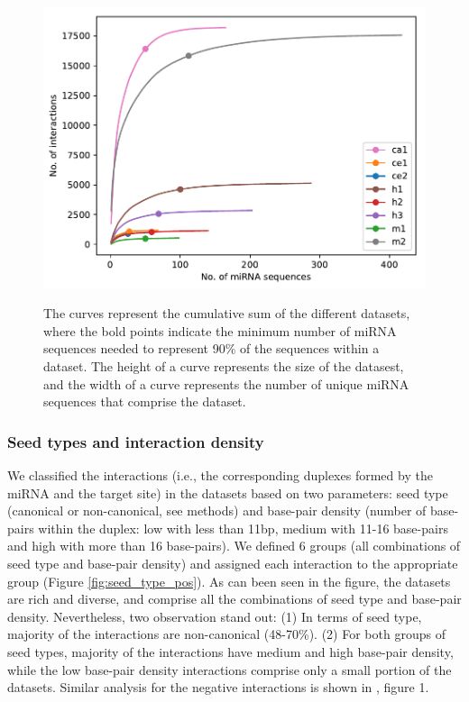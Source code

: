\documentclass{bmcart}
\begin{document}
\begin{figure}[h!]
  \caption{ The curves represent the cumulative sum of the different datasets, where the bold points indicate the minimum number of miRNA sequences needed to represent 90\% of the sequences within a dataset. The height of a curve represents the size of the datasest, and the width of a curve represents the number of unique miRNA sequences that comprise the dataset.}
      \includegraphics[width = 1\textwidth]{Results/mirna_dist.pdf}
      \label{fig:datasetplot}
      \end{figure}


\subsubsection*{Seed types and interaction density}
We classified the interactions (i.e., the corresponding duplexes formed by the miRNA and the target site) in the datasets based on two parameters: seed type (canonical or non-canonical, see methods) and base-pair density (number of base-pairs within the duplex: low with less than 11bp, medium with 11-16 base-pairs and high with more than 16 base-pairs). We defined 6 groups (all combinations of seed type and base-pair density) and assigned each interaction to the appropriate group (Figure \ref{fig:seed_type_pos}). As can been seen in the figure, the datasets are rich and diverse, and comprise all the combinations of seed type and base-pair density.
Nevertheless, two observation stand out: 
(1) In terms of seed type, majority of the interactions are non-canonical (48-70\%). (2) For both groups of seed types,  majority of the interactions have medium and high base-pair density, while the low base-pair density interactions comprise only a small portion of the datasets. 
Similar analysis for the negative interactions is shown in , figure 1.
\end{document}
